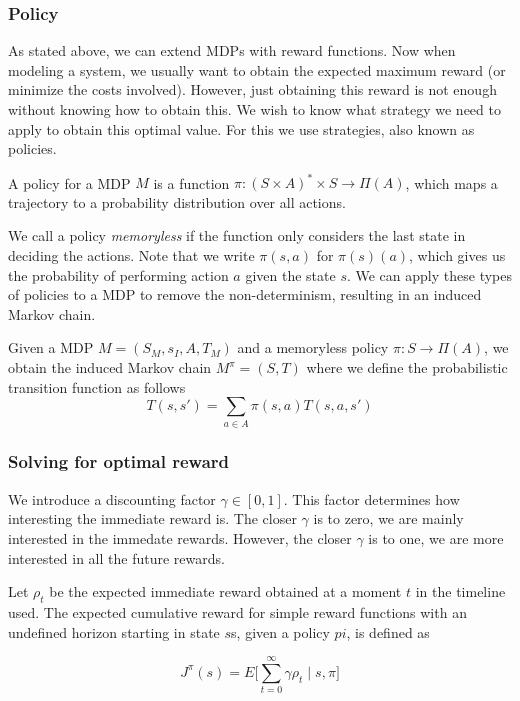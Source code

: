 \subsubsection*{Policy}
As stated above, we can extend MDPs with reward functions. Now when modeling a system, we usually want to obtain the expected maximum reward (or minimize the costs involved). However, just obtaining this reward is not enough without knowing how to obtain this. We wish to know what strategy we need to apply to obtain this optimal value. For this we use strategies, also known as policies. 

\begin{definition}[Policy]
	A policy for a MDP $M$ is a function $\pi:(S\times A)^*\times S \to \Pi(A)$, which maps a trajectory to a probability distribution over all actions. 
\end{definition}

We call a policy \textit{memoryless} if the function only considers the last state in deciding the actions. Note that we write $\pi(s,a)$ for $\pi(s)(a)$, which gives us the probability of performing action $a$ given the state $s$. We can apply these types of policies to a MDP to remove the non-determinism, resulting in an induced Markov chain.

\begin{definition}
Given a MDP $M=(S_M,s_I,A,T_M)$ and a memoryless policy $\pi:S\to\Pi(A)$, we obtain the induced Markov chain $M^\pi=(S,T)$ where we define the probabilistic transition function as follows \[ T(s,s') = \sum\limits_{a\in A} \pi(s,a) T(s,a,s')\]
\end{definition}

\subsubsection*{Solving for optimal reward}
We introduce a discounting factor $\gamma\in[0,1]$. This factor determines how interesting the immediate reward is. The closer $\gamma$ is to zero, we are mainly interested in the immedate rewards. However, the closer $\gamma$ is to one, we are more interested in all the future rewards. 

Let $\rho_t$ be the expected immediate reward obtained at a moment $t$ in the timeline used. The expected cumulative reward for simple reward functions with an undefined horizon starting in state $s$s, given a policy $pi$, is defined as

\[
	J^\pi(s)=E \big[\sum_{t=0}^{\infty}\gamma \rho_t\mid s,\pi\big]
\]


